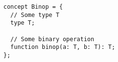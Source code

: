 \begin{verbatim}
concept Binop = {
  // Some type T
  type T;

  // Some binary operation
  function binop(a: T, b: T): T;
};
\end{verbatim}
